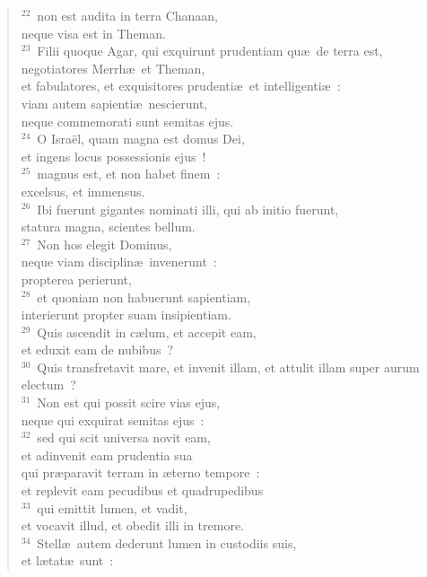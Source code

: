\begin{flushleft}
\begin{verse}
${}^{22}$~non est audita in terra Chanaan,\\ neque visa est in Theman.\\
${}^{23}$~Filii quoque Agar, qui exquirunt prudentiam qu\ae\ de terra est,\\ negotiatores Merrh\ae\ et Theman,\\ et fabulatores, et exquisitores prudenti\ae\ et intelligenti\ae~:\\ viam autem sapienti\ae\ nescierunt,\\ neque commemorati sunt semitas ejus.\\
${}^{24}$~O Isra\"el, quam magna est domus Dei,\\ et ingens locus possessionis ejus~!\\
${}^{25}$~magnus est, et non habet finem~:\\ excelsus, et immensus.\\
${}^{26}$~Ibi fuerunt gigantes nominati illi, qui ab initio fuerunt,\\ statura magna, scientes bellum.\\
${}^{27}$~Non hos elegit Dominus,\\ neque viam disciplin\ae\ invenerunt~:\\ propterea perierunt,\\
${}^{28}$~et quoniam non habuerunt sapientiam,\\ interierunt propter suam insipientiam.\\
${}^{29}$~Quis ascendit in c\ae lum, et accepit eam,\\ et eduxit eam de nubibus~?\\
${}^{30}$~Quis transfretavit mare, et invenit illam, et attulit illam super aurum electum~?\\
${}^{31}$~Non est qui possit scire vias ejus,\\ neque qui exquirat semitas ejus~:\\
${}^{32}$~sed qui scit universa novit eam,\\ et adinvenit eam prudentia sua\\ qui pr\ae paravit terram in \ae terno tempore~:\\ et replevit eam pecudibus et quadrupedibus\\
${}^{33}$~qui emittit lumen, et vadit,\\ et vocavit illud, et obedit illi in tremore.\\
${}^{34}$~Stell\ae\ autem dederunt lumen in custodiis suis,\\ et l\ae tat\ae\ sunt~:\\

\end{verse}
\end{flushleft}
